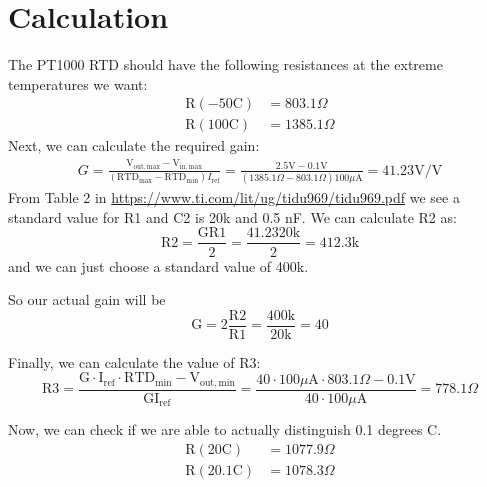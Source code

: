 \documentclass[12pt,openright,twoside]{report}
\begin{document}
\section{Calculation}
The PT1000 RTD should have the following resistances at the extreme temperatures we want:
\begin{align}
\mathrm{R}(-50 \mathrm{C}) &= 803.1 \Omega \\
\mathrm{R}(100 \mathrm{C}) &= 1385.1 \Omega
\end{align}
Next, we can calculate the required gain:
\begin{align}
G = \frac{\mathrm{V}_\mathrm{out,max}-\mathrm{V}_\mathrm{in,max}}{\left(\mathrm{RTD}_\mathrm{max}-\mathrm{RTD}_\mathrm{min}\right)I_\mathrm{ref}} = \frac{2.5 \mathrm{V} - 0.1 \mathrm{V}}{\left(1385.1 \Omega - 803.1 \Omega\right) 100 \mu \mathrm{A}} = 41.23 \mathrm{V/V}
\end{align}
From Table 2 in \url{https://www.ti.com/lit/ug/tidu969/tidu969.pdf} we see a standard value for R1 and C2 is 20k and 0.5 nF. We can calculate R2 as:
\begin{equation}
\mathrm{R2} = \frac{\mathrm{G} \mathrm{R1}}{2} = \frac{41.23 20\mathrm{k}}{2} = 412.3\mathrm{k}
\end{equation}
and we can just choose a standard value of 400k.

So our actual gain will be
\begin{equation}
\mathrm{G} = 2\frac{\mathrm{R2}}{\mathrm{R1}} = \frac{400\mathrm{k}}{20\mathrm{k}} = 40
\end{equation}

Finally, we can calculate the value of R3:
\begin{equation}
\mathrm{R3} = \frac{\mathrm{G}\cdot\mathrm{I}_\mathrm{ref}\cdot\mathrm{RTD}_\mathrm{min} - \mathrm{V}_\mathrm{out,min}}{\mathrm{G}\mathrm{I}_\mathrm{ref}} = \frac{40 \cdot 100 \mu \mathrm{A} \cdot 803.1 \Omega - 0.1 \mathrm{V}}{40 \cdot 100 \mu \mathrm{A}} = 778.1 \Omega
\end{equation}

Now, we can check if we are able to actually distinguish 0.1 degrees C.
\begin{align}
\mathrm{R}(20 \mathrm{C}) &= 1077.9 \Omega \\
\mathrm{R}(20.1 \mathrm{C}) &= 1078.3 \Omega
\end{align}
\end{document}
